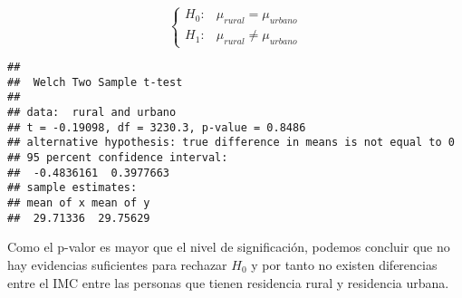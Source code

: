 \documentclass[
]{article}
\newenvironment{Shaded}{\begin{snugshade}}{\end{snugshade}}
\newcommand{\AttributeTok}[1]{\textcolor[rgb]{0.77,0.63,0.00}{#1}}
\newcommand{\CommentTok}[1]{\textcolor[rgb]{0.56,0.35,0.01}{\textit{#1}}}
\newcommand{\ConstantTok}[1]{\textcolor[rgb]{0.00,0.00,0.00}{#1}}
\newcommand{\FloatTok}[1]{\textcolor[rgb]{0.00,0.00,0.81}{#1}}
\newcommand{\FunctionTok}[1]{\textcolor[rgb]{0.00,0.00,0.00}{#1}}
\newcommand{\NormalTok}[1]{#1}
\newcommand{\OtherTok}[1]{\textcolor[rgb]{0.56,0.35,0.01}{#1}}
\newcommand{\SpecialCharTok}[1]{\textcolor[rgb]{0.00,0.00,0.00}{#1}}
\newcommand{\StringTok}[1]{\textcolor[rgb]{0.31,0.60,0.02}{#1}}
\begin{document}
\[ \left\{ \begin{array}{lc}
             H_{0}: & \mu_{rural} = \mu_{urbano} \\
             H_{1}: & \mu_{rural} \neq \mu_{urbano}
             \end{array}
\right. \]

\begin{Shaded}
\end{Shaded}

\begin{verbatim}
## 
##  Welch Two Sample t-test
## 
## data:  rural and urbano
## t = -0.19098, df = 3230.3, p-value = 0.8486
## alternative hypothesis: true difference in means is not equal to 0
## 95 percent confidence interval:
##  -0.4836161  0.3977663
## sample estimates:
## mean of x mean of y 
##  29.71336  29.75629
\end{verbatim}

Como el p-valor es mayor que el nivel de significación, podemos concluir
que no hay evidencias suficientes para rechazar \(H_{0}\) y por tanto no
existen diferencias entre el IMC entre las personas que tienen
residencia rural y residencia urbana.
\end{document}
